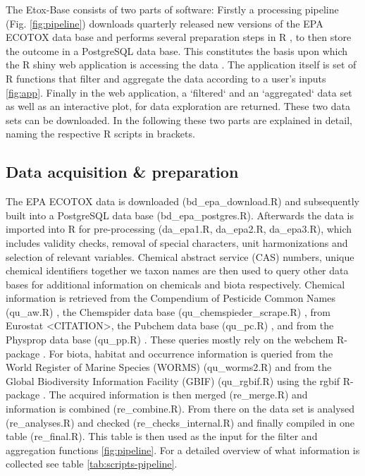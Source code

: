 \documentclass[english]{article}
\newcommand{\etoxbase}{Etox-Base}
\newcommand{\epa}{EPA ECOTOX data base}
\begin{document}
The \etoxbase{} consists of two parts of software: Firstly a processing pipeline (Fig. \ref{fig:pipeline}) downloads quarterly released new versions of the \epa{} and performs several preparation steps in R \citep{r_core_team_r_2017}, to then store the outcome in a PostgreSQL data base. This constitutes the basis upon which the R shiny web application is accessing the data \citep{r_core_team_r_2017}. The application itself is set of R functions that filter and aggregate the data according to a user's inputs \ref{fig:app}. Finally in the web application, a `filtered` and an `aggregated` data set as well as an interactive plot, for data exploration are returned. These two data sets can be downloaded. In the following these two parts are explained in detail, naming the respective R scripts in brackets.

\subsection*{Data acquisition \& preparation}

The EPA ECOTOX data is downloaded (bd\_epa\_download.R) and subsequently built into a PostgreSQL data base (bd\_epa\_postgres.R). Afterwards the data is imported into R for pre-processing (da\_epa1.R, da\_epa2.R, da\_epa3.R), which includes validity checks, removal of special characters, unit harmonizations and selection of relevant variables. Chemical abstract service (CAS) numbers, unique chemical identifiers together we taxon names are then used to query other data bases for additional information on chemicals and biota respectively. Chemical information is retrieved from the Compendium of Pesticide Common Names (qu\_aw.R) \citep{CITE_AW}, the Chemspider data base (qu\_chemspieder\_scrape.R) \citep{CITE-CHEMSPIDER}, from Eurostat <CITATION>, the Pubchem data base (qu\_pc.R) \citep{CITE_PUBCHEM}, and from the Physprop data base (qu\_pp.R) \citep{CITE_PHYSPROP}. These queries mostly rely on the webchem R-package \citep{szocs_webchem_2015-1}. For biota, habitat and occurrence information is queried from the World Register of Marine Species (WORMS) (qu\_worms2.R) \citep{WORMS} and from the Global Biodiversity Information Facility (GBIF) (qu\_rgbif.R) \citep{CITE_RGBIF} using the rgbif R-package \citep{chamberlain_rgbif_2018}. The acquired information is then merged (re\_merge.R) and information is combined (re\_combine.R). From there on the data set is analysed (re\_analyses.R) and checked (re\_checks\_internal.R) and finally compiled in one table (re\_final.R). This table is then used as the input for the filter and aggregation functions \ref{fig:pipeline}. For a detailed overview of what information is collected see table \ref{tab:scripts-pipeline}.
\end{document}
